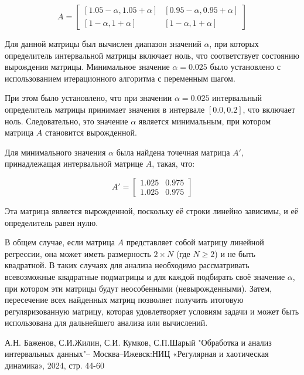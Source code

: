 \documentclass[a4paper,14pt]{article}
\begin{document}
	\[
		A = \begin{bmatrix}
		[1.05 - \alpha, 1.05 + \alpha] & [0.95 - \alpha, 0.95 + \alpha] \\
		[1 - \alpha, 1 + \alpha] & [1 - \alpha, 1 + \alpha]
		\end{bmatrix}
	\]

	Для данной матрицы был вычислен диапазон значений \(\alpha\), при которых
	определитель интервальной матрицы включает ноль, что соответствует
	состоянию вырождения матрицы. Минимальное значение \(\alpha = 0.025\)
	было установлено с использованием итерационного алгоритма с переменным
	шагом.

	При этом было установлено, что при значении \( \alpha = 0.025 \)
	интервальный определитель матрицы принимает значения в интервале
	\( [0.0, 0.2] \), что включает ноль. Следовательно, это значение
	\( \alpha \) является минимальным, при котором матрица \( A \) становится
	вырожденной.

	Для минимального значения \( \alpha \) была найдена точечная матрица
	\(A'\), принадлежащая интервальной матрице \( A \), такая, что:

	\[
		A' = \begin{bmatrix}
		1.025 & 0.975 \\
		1.025 & 0.975
		\end{bmatrix}
	\]

	Эта матрица является вырожденной, поскольку её строки линейно зависимы,
	и её определитель равен нулю.

	В общем случае, если матрица \( A \) представляет собой матрицу линейной
	регрессии, она может иметь размерность \(2 \times N\) (где \(N \geq 2\)) и
	не быть квадратной. В таких случаях для анализа необходимо рассматривать
	всевозможные квадратные подматрицы и для каждой подбирать своё значение
	\( \alpha \), при котором эти матрицы будут неособенными
	(невырожденными). Затем, пересечение всех найденных матриц позволяет
	получить итоговую регуляризованную матрицу, которая удовлетворяет
	условиям задачи и может быть использована для дальнейшего анализа или
	вычислений.
	
	\begin{thebibliography}{1}
		А.Н. Баженов, С.И.Жилин, С.И. Кумков, С.П.Шарый "Обработка и анализ интервальных данных"– Москва–Ижевск:НИЦ «Регулярная и хаотическая динамика», 2024, стр. 44-60
	\end{thebibliography}
	
\end{document}
